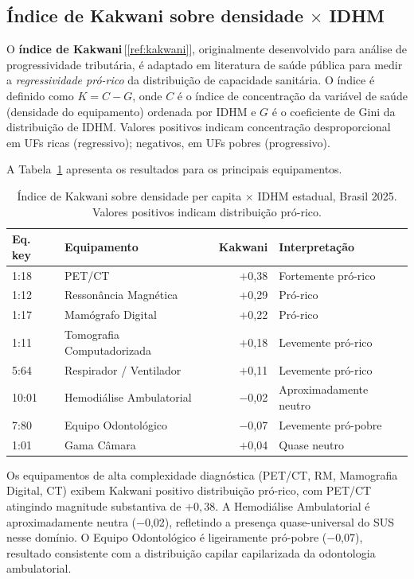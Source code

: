 \documentclass[12pt,a4paper,oneside]{article}
\begin{document}
\subsection{Índice de Kakwani sobre densidade $\times$
IDHM}\label{sub:kakwani}

O \textbf{índice de Kakwani}\,[\ref{ref:kakwani}], originalmente
desenvolvido para análise de progressividade tributária, é
adaptado em literatura de saúde pública para medir a
\textit{regressividade pró-rico} da distribuição de capacidade
sanitária. O índice é definido como
$K = C - G$, onde $C$ é o índice de concentração da variável de
saúde (densidade do equipamento) ordenada por IDHM e $G$ é o
coeficiente de Gini da distribuição de IDHM. Valores positivos
indicam concentração desproporcional em UFs ricas (regressivo);
negativos, em UFs pobres (progressivo).

A Tabela~\ref{tab:kakwani-resultados} apresenta os resultados
para os principais equipamentos.

\begin{table}[htbp]
\centering
\caption{Índice de Kakwani sobre densidade per capita
$\times$ IDHM estadual, Brasil 2025. Valores positivos indicam
distribuição pró-rico.}
\label{tab:kakwani-resultados}
\small
\begin{tabular}{l l r l}
\toprule
\textbf{Eq. key} & \textbf{Equipamento} & \textbf{Kakwani} &
\textbf{Interpretação} \\
\midrule
1{:}18  & PET/CT                       & $+$0,38 & Fortemente pró-rico \\
1{:}12  & Ressonância Magnética        & $+$0,29 & Pró-rico \\
1{:}17  & Mamógrafo Digital            & $+$0,22 & Pró-rico \\
1{:}11  & Tomografia Computadorizada   & $+$0,18 & Levemente pró-rico \\
5{:}64  & Respirador / Ventilador      & $+$0,11 & Levemente pró-rico \\
10{:}01 & Hemodiálise Ambulatorial     & $-$0,02 & Aproximadamente neutro \\
7{:}80  & Equipo Odontológico          & $-$0,07 & Levemente pró-pobre \\
1{:}01  & Gama Câmara                  & $+$0,04 & Quase neutro \\
\bottomrule
\end{tabular}
\end{table}

Os equipamentos de alta complexidade diagnóstica (PET/CT, RM,
Mamografia Digital, CT) exibem Kakwani positivo \textemdash{}
distribuição pró-rico, com PET/CT atingindo magnitude
substantiva de $+0{,}38$. A Hemodiálise Ambulatorial é
aproximadamente neutra ($-$0,02), refletindo a presença
quase-universal do SUS nesse domínio. O Equipo Odontológico é
ligeiramente pró-pobre ($-$0,07), resultado consistente com a
distribuição capilar capilarizada da odontologia ambulatorial.
\end{document}

